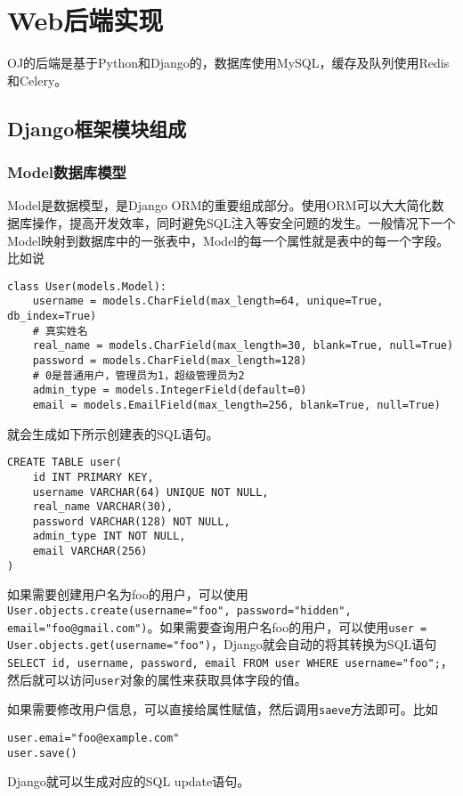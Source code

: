 \section{Web后端实现}

OJ的后端是基于Python和Django的，数据库使用MySQL，缓存及队列使用Redis和Celery。

\subsection{Django框架模块组成}

\subsubsection{Model数据库模型}
Model是数据模型，是Django ORM的重要组成部分。使用ORM可以大大简化数据库操作，提高开发效率，同时避免SQL注入等安全问题的发生。一般情况下一个Model映射到数据库中的一张表中，Model的每一个属性就是表中的每一个字段。比如说

\begin{verbatim}
class User(models.Model):
    username = models.CharField(max_length=64, unique=True, db_index=True)
    # 真实姓名
    real_name = models.CharField(max_length=30, blank=True, null=True)
    password = models.CharField(max_length=128)
    # 0是普通用户，管理员为1，超级管理员为2
    admin_type = models.IntegerField(default=0)
    email = models.EmailField(max_length=256, blank=True, null=True)
\end{verbatim}就会生成如下所示创建表的SQL语句。

\begin{verbatim}
CREATE TABLE user(
    id INT PRIMARY KEY,
    username VARCHAR(64) UNIQUE NOT NULL,
    real_name VARCHAR(30),
    password VARCHAR(128) NOT NULL,
    admin_type INT NOT NULL,
    email VARCHAR(256)
)
\end{verbatim}
如果需要创建用户名为foo的用户，可以使用\\\texttt{User.objects.create(username="foo", password="hidden", email="foo@gmail.com")}。如果需要查询用户名foo的用户，可以使用\texttt{user = User.objects.get(username="foo")}，Django就会自动的将其转换为SQL语句\texttt{SELECT id, username, password, email FROM user WHERE username="foo";}，然后就可以访问\texttt{user}对象的属性来获取具体字段的值。

如果需要修改用户信息，可以直接给属性赋值，然后调用\texttt{saeve}方法即可。比如
\begin{verbatim}
user.emai="foo@example.com"
user.save()
\end{verbatim}Django就可以生成对应的SQL update语句。

